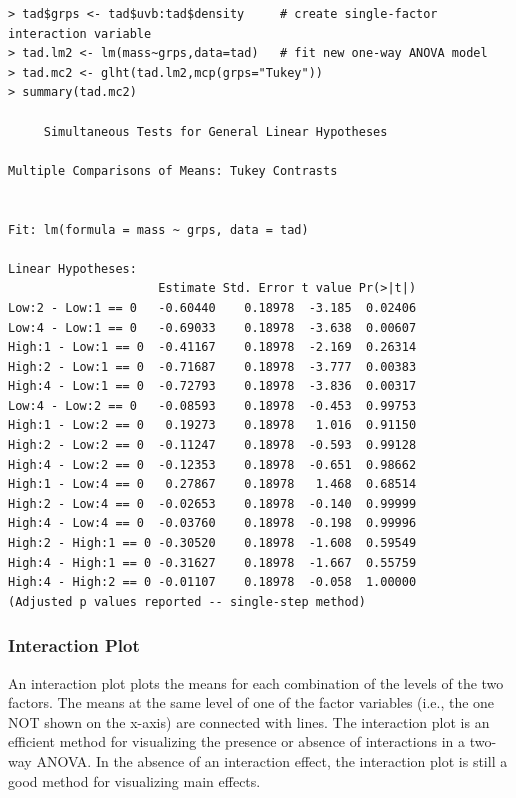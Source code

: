 \documentclass[10pt,openany]{book}\usepackage[]{graphicx}\usepackage[]{color}
\makeatletter
\newenvironment{kframe}{%
 \def\at@end@of@kframe{}%
 \ifinner\ifhmode%
  \def\at@end@of@kframe{\end{minipage}}%
  \begin{minipage}{\columnwidth}%
 \fi\fi%
 \def\FrameCommand##1{\hskip\@totalleftmargin \hskip-\fboxsep
 \colorbox{shadecolor}{##1}\hskip-\fboxsep
     \hskip-\linewidth \hskip-\@totalleftmargin \hskip\columnwidth}%
 \MakeFramed {\advance\hsize-\width
   \@totalleftmargin\z@ \linewidth\hsize
   \@setminipage}}%
 {\par\unskip\endMakeFramed%
 \at@end@of@kframe}
\newenvironment{knitrout}{}{} %
\makeatother
\begin{document}
\begin{knitrout}
\color{fgcolor}\begin{kframe}
\begin{verbatim}
> tad$grps <- tad$uvb:tad$density     # create single-factor interaction variable
> tad.lm2 <- lm(mass~grps,data=tad)   # fit new one-way ANOVA model
> tad.mc2 <- glht(tad.lm2,mcp(grps="Tukey"))
> summary(tad.mc2)

	 Simultaneous Tests for General Linear Hypotheses

Multiple Comparisons of Means: Tukey Contrasts


Fit: lm(formula = mass ~ grps, data = tad)

Linear Hypotheses:
                     Estimate Std. Error t value Pr(>|t|)
Low:2 - Low:1 == 0   -0.60440    0.18978  -3.185  0.02406
Low:4 - Low:1 == 0   -0.69033    0.18978  -3.638  0.00607
High:1 - Low:1 == 0  -0.41167    0.18978  -2.169  0.26314
High:2 - Low:1 == 0  -0.71687    0.18978  -3.777  0.00383
High:4 - Low:1 == 0  -0.72793    0.18978  -3.836  0.00317
Low:4 - Low:2 == 0   -0.08593    0.18978  -0.453  0.99753
High:1 - Low:2 == 0   0.19273    0.18978   1.016  0.91150
High:2 - Low:2 == 0  -0.11247    0.18978  -0.593  0.99128
High:4 - Low:2 == 0  -0.12353    0.18978  -0.651  0.98662
High:1 - Low:4 == 0   0.27867    0.18978   1.468  0.68514
High:2 - Low:4 == 0  -0.02653    0.18978  -0.140  0.99999
High:4 - Low:4 == 0  -0.03760    0.18978  -0.198  0.99996
High:2 - High:1 == 0 -0.30520    0.18978  -1.608  0.59549
High:4 - High:1 == 0 -0.31627    0.18978  -1.667  0.55759
High:4 - High:2 == 0 -0.01107    0.18978  -0.058  1.00000
(Adjusted p values reported -- single-step method)
\end{verbatim}
\end{kframe}
\end{knitrout}

\subsubsection*{Interaction Plot}
An interaction plot plots the means for each combination of the levels of the two factors.  The means at the same level of one of the factor variables (i.e., the one NOT shown on the x-axis) are connected with lines.  The interaction plot is an efficient method for visualizing the presence or absence of interactions in a two-way ANOVA.  In the absence of an interaction effect, the interaction plot is still a good method for visualizing main effects.
\end{document}
